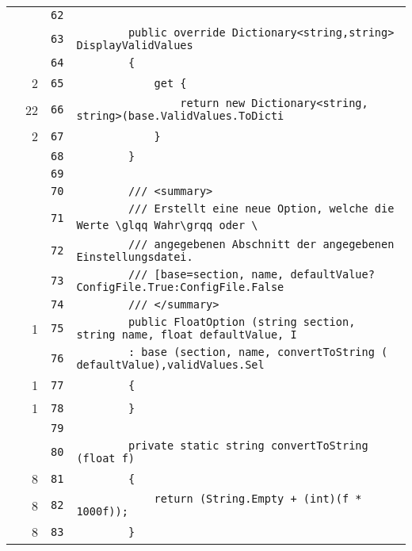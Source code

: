 \documentclass[a4paper,10pt]{article}
\begin{document}
\begin{longtable}[l]{lrrl}
\cellcolor{gray} &  & \verb~62~ & \verb~~\\
\cellcolor{gray} &  & \verb~63~ & \verb~        public override Dictionary<string,string> DisplayValidValues~\\
\cellcolor{gray} &  & \verb~64~ & \verb~        {~\\
\cellcolor{green} & 2 & \verb~65~ & \verb~            get {~\\
\cellcolor{green} & 22 & \verb~66~ & \verb~                return new Dictionary<string, string>(base.ValidValues.ToDicti~\\
\cellcolor{green} & 2 & \verb~67~ & \verb~            }~\\
\cellcolor{gray} &  & \verb~68~ & \verb~        }~\\
\cellcolor{gray} &  & \verb~69~ & \verb~~\\
\cellcolor{gray} &  & \verb~70~ & \verb~        /// <summary>~\\
\cellcolor{gray} &  & \verb~71~ & \verb~        /// Erstellt eine neue Option, welche die Werte \glqq Wahr\grqq oder \~\\
\cellcolor{gray} &  & \verb~72~ & \verb~        /// angegebenen Abschnitt der angegebenen Einstellungsdatei.~\\
\cellcolor{gray} &  & \verb~73~ & \verb~        /// [base=section, name, defaultValue?ConfigFile.True:ConfigFile.False~\\
\cellcolor{gray} &  & \verb~74~ & \verb~        /// </summary>~\\
\cellcolor{green} & 1 & \verb~75~ & \verb~        public FloatOption (string section, string name, float defaultValue, I~\\
\cellcolor{gray} &  & \verb~76~ & \verb~        : base (section, name, convertToString ( defaultValue),validValues.Sel~\\
\cellcolor{green} & 1 & \verb~77~ & \verb~        {~\\
\cellcolor{green} & 1 & \verb~78~ & \verb~        }~\\
\cellcolor{gray} &  & \verb~79~ & \verb~~\\
\cellcolor{gray} &  & \verb~80~ & \verb~        private static string convertToString (float f)~\\
\cellcolor{green} & 8 & \verb~81~ & \verb~        {~\\
\cellcolor{green} & 8 & \verb~82~ & \verb~            return (String.Empty + (int)(f * 1000f));~\\
\cellcolor{green} & 8 & \verb~83~ & \verb~        }~\\

\end{longtable}
\end{document}
